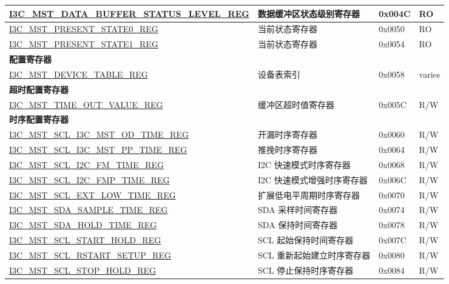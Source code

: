 \begin{longtable}{ | p{7.5cm} | p{6cm} | p{1.3cm} | p{1.5cm} | }
\hyperref[regdesc:I3CMSTDATABUFFERSTATUSLEVELREG]{I3C\_MST\_DATA\_BUFFER\_STATUS\_LEVEL\_REG} & 数据缓冲区状态级别寄存器 & 0x004C & RO \\ \hline
\hyperref[regdesc:I3CMSTPRESENTSTATE0REG]{I3C\_MST\_PRESENT\_STATE0\_REG} & 当前状态寄存器 & 0x0050 & RO \\ \hline
\hyperref[regdesc:I3CMSTPRESENTSTATE1REG]{I3C\_MST\_PRESENT\_STATE1\_REG} & 当前状态寄存器 & 0x0054 & RO \\ \hline
\multicolumn{4}{|l|}{\textbf{配置寄存器}} \\ \hline
\hyperref[regdesc:I3CMSTDEVICETABLEREG]{I3C\_MST\_DEVICE\_TABLE\_REG} & 设备表索引 & 0x0058 & varies \\ \hline
\multicolumn{4}{|l|}{\textbf{超时配置寄存器}} \\ \hline
\hyperref[regdesc:I3CMSTTIMEOUTVALUEREG]{I3C\_MST\_TIME\_OUT\_VALUE\_REG} & 缓冲区超时值寄存器 & 0x005C & R/W \\ \hline
\multicolumn{4}{|l|}{\textbf{时序配置寄存器}} \\ \hline
\hyperref[regdesc:I3CMSTSCLI3CMSTODTIMEREG]{I3C\_MST\_SCL\_I3C\_MST\_OD\_TIME\_REG} & 开漏时序寄存器 & 0x0060 & R/W \\ \hline
\hyperref[regdesc:I3CMSTSCLI3CMSTPPTIMEREG]{I3C\_MST\_SCL\_I3C\_MST\_PP\_TIME\_REG} & 推挽时序寄存器 & 0x0064 & R/W \\ \hline
\hyperref[regdesc:I3CMSTSCLI2CFMTIMEREG]{I3C\_MST\_SCL\_I2C\_FM\_TIME\_REG} & I2C 快速模式时序寄存器 & 0x0068 & R/W \\ \hline
\hyperref[regdesc:I3CMSTSCLI2CFMPTIMEREG]{I3C\_MST\_SCL\_I2C\_FMP\_TIME\_REG} & I2C 快速模式增强时序寄存器 & 0x006C & R/W \\ \hline
\hyperref[regdesc:I3CMSTSCLEXTLOWTIMEREG]{I3C\_MST\_SCL\_EXT\_LOW\_TIME\_REG} & 扩展低电平周期时序寄存器 & 0x0070 & R/W \\ \hline
\hyperref[regdesc:I3CMSTSDASAMPLETIMEREG]{I3C\_MST\_SDA\_SAMPLE\_TIME\_REG} & SDA 采样时间寄存器 & 0x0074 & R/W \\ \hline
\hyperref[regdesc:I3CMSTSDAHOLDTIMEREG]{I3C\_MST\_SDA\_HOLD\_TIME\_REG} & SDA 保持时间寄存器 & 0x0078 & R/W \\ \hline
\hyperref[regdesc:I3CMSTSCLSTARTHOLDREG]{I3C\_MST\_SCL\_START\_HOLD\_REG} & SCL 起始保持时间寄存器 & 0x007C & R/W \\ \hline
\hyperref[regdesc:I3CMSTSCLRSTARTSETUPREG]{I3C\_MST\_SCL\_RSTART\_SETUP\_REG} & SCL 重新起始建立时序寄存器 & 0x0080 & R/W \\ \hline
\hyperref[regdesc:I3CMSTSCLSTOPHOLDREG]{I3C\_MST\_SCL\_STOP\_HOLD\_REG} & SCL 停止保持时序寄存器 & 0x0084 & R/W \\ \hline

\end{longtable}
